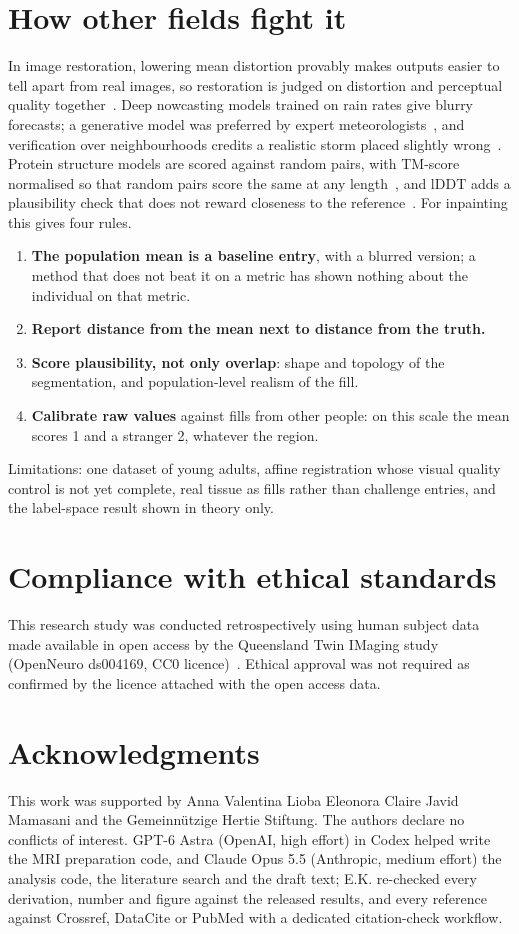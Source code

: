 \documentclass{article}
\begin{document}
\section{How other fields fight it}
\label{sec:fields}
In image restoration, lowering mean distortion provably makes outputs easier to tell apart from real images, so restoration is judged on distortion and perceptual quality together~\cite{blau2018}.
Deep nowcasting models trained on rain rates give blurry forecasts; a generative model was preferred by expert meteorologists~\cite{ravuri2021}, and verification over neighbourhoods credits a realistic storm placed slightly wrong~\cite{roberts2008}.
Protein structure models are scored against random pairs, with TM-score normalised so that random pairs score the same at any length~\cite{zhang2004}, and lDDT adds a plausibility check that does not reward closeness to the reference~\cite{mariani2013}.
For inpainting this gives four rules.
\begin{enumerate}
\item \textbf{The population mean is a baseline entry}, with a blurred version; a method that does not beat it on a metric has shown nothing about the individual on that metric.
\item \textbf{Report distance from the mean next to distance from the truth.}
\item \textbf{Score plausibility, not only overlap}: shape and topology of the segmentation, and population-level realism of the fill.
\item \textbf{Calibrate raw values} against fills from other people: on this scale the mean scores 1 and a stranger 2, whatever the region.
\end{enumerate}
Limitations: one dataset of young adults, affine registration whose visual quality control is not yet complete, real tissue as fills rather than challenge entries, and the label-space result shown in theory only.
\section{Compliance with ethical standards}
\label{sec:ethics}
This research study was conducted retrospectively using human subject data made available in open access by the Queensland Twin IMaging study (OpenNeuro ds004169, CC0 licence)~\cite{qtim2026}.
Ethical approval was not required as confirmed by the licence attached with the open access data.

\section{Acknowledgments}
\label{sec:acknowledgments}
This work was supported by Anna Valentina Lioba Eleonora Claire Javid Mamasani and the Gemeinn\"utzige Hertie Stiftung.
The authors declare no conflicts of interest.
GPT-6 Astra (OpenAI, high effort) in Codex helped write the MRI preparation code, and Claude Opus 5.5 (Anthropic, medium effort) the analysis code, the literature search and the draft text; E.K. re-checked every derivation, number and figure against the released results, and every reference against Crossref, DataCite or PubMed with a dedicated citation-check workflow.


{\small}
\end{document}
